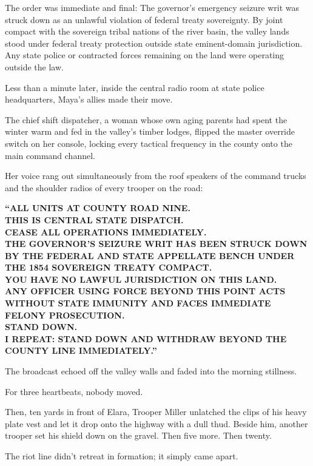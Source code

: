 The order was immediate and final: The governor's emergency seizure writ was struck down as an unlawful violation of federal treaty sovereignty. By joint compact with the sovereign tribal nations of the river basin, the valley lands stood under federal treaty protection outside state eminent-domain jurisdiction. Any state police or contracted forces remaining on the land were operating outside the law.

Less than a minute later, inside the central radio room at state police headquarters, Maya’s allies made their move. 

The chief shift dispatcher, a woman whose own aging parents had spent the winter warm and fed in the valley’s timber lodges, flipped the master override switch on her console, locking every tactical frequency in the county onto the main command channel.

Her voice rang out simultaneously from the roof speakers of the command trucks and the shoulder radios of every trooper on the road:

\begin{center}
\textbf{``ALL UNITS AT COUNTY ROAD NINE.}\\
\textbf{THIS IS CENTRAL STATE DISPATCH.}\\
\textbf{CEASE ALL OPERATIONS IMMEDIATELY.}\\
\textbf{THE GOVERNOR'S SEIZURE WRIT HAS BEEN STRUCK DOWN BY THE FEDERAL AND STATE APPELLATE BENCH UNDER THE 1854 SOVEREIGN TREATY COMPACT.}\\
\textbf{YOU HAVE NO LAWFUL JURISDICTION ON THIS LAND.}\\
\textbf{ANY OFFICER USING FORCE BEYOND THIS POINT ACTS WITHOUT STATE IMMUNITY AND FACES IMMEDIATE FELONY PROSECUTION.}\\
\textbf{STAND DOWN.}\\
\textbf{I REPEAT: STAND DOWN AND WITHDRAW BEYOND THE COUNTY LINE IMMEDIATELY.''}
\end{center}

The broadcast echoed off the valley walls and faded into the morning stillness.

For three heartbeats, nobody moved. 

Then, ten yards in front of Elara, Trooper Miller unlatched the clips of his heavy plate vest and let it drop onto the highway with a dull thud. Beside him, another trooper set his shield down on the gravel. Then five more. Then twenty. 

The riot line didn't retreat in formation; it simply came apart. 


